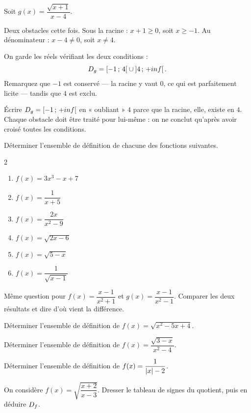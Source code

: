 \begin{exemple}
Soit $g(x) = \dfrac{\sqrt{x+1}}{x-4}$.

Deux obstacles cette fois. Sous la racine : $x + 1 \geq 0$, soit
$x \geq -1$. Au dénominateur : $x - 4 \neq 0$, soit $x \neq 4$.

On garde les réels vérifiant les deux conditions :
\[
  D_{g} = \left[-1\,;\,4\right[ \cup \left]4\,;\,+inf\right[.
\]
Remarquez que $-1$ est conservé — la racine y vaut $0$, ce qui est
parfaitement licite — tandis que $4$ est exclu.
\end{exemple}

\begin{erreurclassique}
Écrire $D_{g} = \left[-1\,;\,+inf\right[$ en « oubliant » $4$ parce que
la racine, elle, existe en $4$. Chaque obstacle doit être traité pour
lui-même : on ne conclut qu'après avoir croisé toutes les conditions.
\end{erreurclassique}

\begin{entrainement}
\exo\label{t11s-c01-e07} Déterminer l'ensemble de définition de chacune des fonctions suivantes.
\begin{multicols}{2}
\begin{enumerate}[label=\textbf{\alph*)}, leftmargin=1.6em, itemsep=0.1em]
  \item $f(x) = 3x^{3} - x + 7$
  \item $f(x) = \dfrac{1}{x+5}$
  \item $f(x) = \dfrac{2x}{x^{2}-9}$
  \item $f(x) = \sqrt{2x-6}$
  \item $f(x) = \sqrt{5-x}$
  \item $f(x) = \dfrac{1}{\sqrt{x-1}}$
\end{enumerate}
\end{multicols}

\exo\label{t11s-c01-e08} Même question pour
$f(x) = \dfrac{x-1}{x^{2}+1}$ et $g(x) = \dfrac{x-1}{x^{2}-1}$.
Comparer les deux résultats et dire d'où vient la différence.

\exo\label{t11s-c01-e09} Déterminer l'ensemble de définition de
$f(x) = \sqrt{x^{2} - 5x + 4}$.

\exo\label{t11s-c01-e10} Déterminer l'ensemble de définition de
$f(x) = \dfrac{\sqrt{3-x}}{x^{2}-4}$.

\exo\label{t11s-c01-e11} Déterminer l'ensemble de définition de
$f(x) = \dfrac{1}{\left|x\right| - 2}$.

\exo\label{t11s-c01-e12} On considère $f(x) = \sqrt{\dfrac{x+2}{x-3}}$. Dresser le tableau de
signes du quotient, puis en déduire $D_{f}$.
\end{entrainement}

